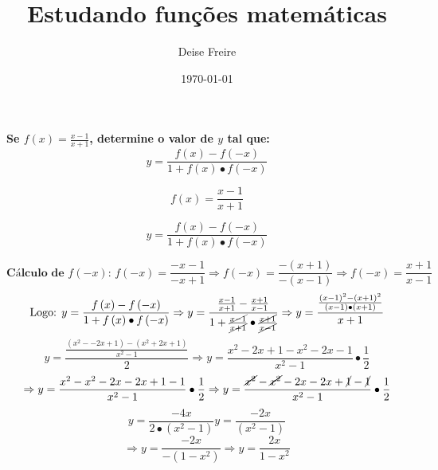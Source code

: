 \documentclass{article} %
\begin{document}
\title{Estudando funções matemáticas} %
\author{ Deise Freire} %
\date{\today} %
\maketitle %
\textbf{Se $f\left( x \right) = \frac{x - 1}{x + 1}$, determine o valor de $y$ tal que: }
\[
y = \frac{f\left( x\right) - f\left( -x \right)}{1 + f\left(x \right) \bullet f\left( -x \right)}
\]
\begin{minipage}{.4\textwidth} %
\begin{equation}
    f\left( x\right) = \frac{x - 1}{x + 1}
\end{equation}
\end{minipage}
\hfill %
\begin{minipage}{.4\textwidth} %
\begin{equation}
y = \frac{f\left(x \right) - f\left( -x \right)}{1 + f\left( x \right) \bullet f\left( -x \right)}
\end{equation}    
\end{minipage}
\[
\textbf{Cálculo de $f\left( -x\right)$: }
f\left(-x \right) = \frac{-x - 1}{-x + 1}
\Rightarrow f\left( -x \right) = \frac{- \left(x + 1 \right)}{-\left(x - 1 \right)}
\Rightarrow f\left( -x \right) = \frac{x + 1}{x - 1}
\]
\[
\text{Logo: }
y = \frac{f\left( x \right) - f\left( -x \right)}{1 + f\left( x \right) \bullet f\left( - x \right)}
\Rightarrow y = \frac{\frac{x - 1}{x + 1} - \frac{x + 1}{x - 1}}{1 + \frac{\cancel{x - 1}}{\cancel{x + 1}} \bullet \frac{\cancel{x + 1}}{\cancel{x - 1}} }
\Rightarrow y = \frac{\frac{\left(x - 1 \right)^{2} - \left(x + 1 \right)^{2}}{\left(x - 1 \right) \bullet \left(x + 1 \right)}}{x + 1}
\]
\[
y = \frac{\frac{\left(x^{2} - -2x +1 \right) - \left( x^{2} + 2x + 1 \right)}{x^{2} - 1}}{2}
\Rightarrow y = \frac{x^{2} - 2x + 1 - x^{2} - 2x - 1}{x^{2} - 1} \bullet \frac{1}{2}
\]
\[
\Rightarrow y = \frac{x^{2} - x^{2} - 2x - 2x + 1 - 1}{x^{2} - 1} \bullet \frac{1}{2}
\Rightarrow y = \frac{\cancel{x^{2}} - \cancel{x^{2}} - 2x - 2x + \cancel{1} - \cancel{1}}{x^{2} - 1} \bullet \frac{1}{2}
\]
\[
y = \frac{-4x}{2 \bullet \left(x^{2} - 1 \right)}
y = \frac{-2x}{\left( x^{2} - 1 \right)}
\]
\[
\Rightarrow y = \frac{-2x}{- \left(1 - x^{2} \right)}
\Rightarrow y = \frac{2x}{1 - x^{2}}
\]
\end{document}

